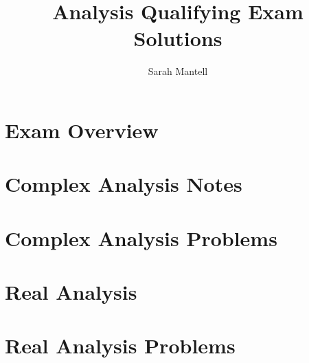 \documentclass[
    letterpaper,
    fontsize=12pt,
    twoside=false,
    secnumdepth=1
]{kaonotes}
\begin{document}
    \title[Analysis Qualifying Exam Solutions]{Analysis Qualifying Exam Solutions}

    \author{Sarah Mantell}
    
    \frontmatter
    \maketitle

    \mainmatter
    \setchapterpreamble[u]{\margintoc}
    \chapter{Exam Overview}

    \chapter{Complex Analysis Notes}
        

    \chapter{Complex Analysis Problems}
        

    \chapter{Real Analysis}
    \chapter{Real Analysis Problems}
\end{document}
